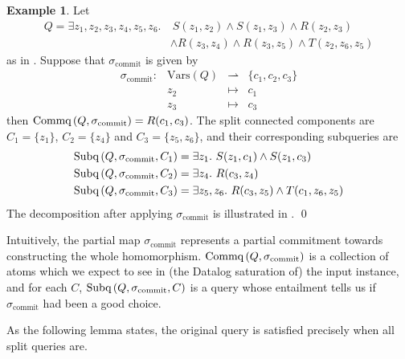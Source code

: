 \documentclass[12pt]{report}
\theoremstyle{plain}
\theoremstyle{definition}
\newtheorem{example}[theorem]{Example}
\def\Vars{{\mathrm{Vars}}}
\newcommand{\Subq}[3]{\ensuremath{\normalfont{\textrm{Subq}} \left( #1, #2, #3 \right)}}
\newcommand{\Commq}[2]{\ensuremath{\normalfont{\textrm{Commq}} \left( #1, #2 \right)}}
\begin{document}
\begin{example}
\label{bcq-decomposition-example}
  Let
  \begin{align*}
    Q = \exists z_1,z_2,z_3,z_4,z_5,z_6.&\ S(z_1, z_2) \wedge S(z_1,z_3) \wedge R(z_2, z_3) \\
    &\wedge R(z_3, z_4) \wedge R(z_3, z_5) \wedge T(z_2, z_6, z_5)
  \end{align*}
  as in . Suppose that $\sigma_{\mathrm{commit}}$ is given by \[\begin{array}{cccc}
    \sigma_{\mathrm{commit}}: &\Vars(Q) &\rightharpoonup &\{c_1, c_2, c_3\} \\
    &z_2 &\mapsto &c_1 \\
    &z_3 &\mapsto &c_3
  \end{array}\]
  then $\Commq{Q}{\sigma_{\mathrm{commit}}} = R(c_1, c_3)$. The split connected components are $C_1 = \{z_1\}$, $C_2 = \{z_4\}$ and $C_3 = \{z_5, z_6\}$, and their corresponding subqueries are
  \begin{align*}
    \Subq{Q}{\sigma_{\mathrm{commit}}}{C_1} &= \exists z_1.\ S(z_1, c_1) \wedge S(z_1, c_3) \\
    \Subq{Q}{\sigma_{\mathrm{commit}}}{C_2} &= \exists z_4.\ R(c_3, z_4) \\
    \Subq{Q}{\sigma_{\mathrm{commit}}}{C_3} &= \exists z_5, z_6.\ R(c_3, z_5) \wedge T(c_1, z_6, z_5)
  \end{align*}
  The decomposition after applying $\sigma_{\mathrm{commit}}$ is illustrated in .
  \qed
\end{example}

Intuitively, the partial map $\sigma_{\mathrm{commit}}$ represents a partial commitment towards constructing the whole homomorphism. $\Commq{Q}{\sigma_{\mathrm{commit}}}$ is a collection of atoms which we expect to see in (the Datalog saturation of) the input instance, and for each $C$, $\Subq{Q}{\sigma_{\mathrm{commit}}}{C}$ is a query whose entailment tells us if $\sigma_{\mathrm{commit}}$ had been a good choice.

As the following lemma states, the original query is satisfied precisely when all split queries are.
\end{document}
